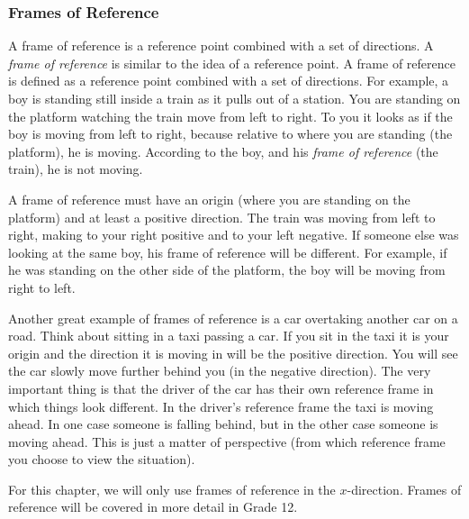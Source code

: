             \subsubsection*{Frames of Reference}
            \nopagebreak
\par
{} { A frame of reference is a reference point combined with a set of directions. } 
        \label{m38787*id62648}A \textsl{frame of reference} is similar to the idea of a reference point. A frame of reference is defined as a reference point combined with a set of directions. For example, a boy is standing still inside a train as it pulls out of a station. You are standing on the platform watching the train move from left to right. To you it looks as if the boy is moving from left to right, because relative to where you are standing (the platform), he is moving. According to the boy, and his \textsl{frame of reference} (the train), he is not moving.\par 
        \label{m38787*id62666}A frame of reference must have an origin (where you are standing on the platform) and at least a positive direction. The train was moving from left to right, making to your right positive and to your left negative. If someone else was looking at the same boy, his frame of reference will be different. For example, if he was standing on the other side of the platform, the boy will be moving from right to left.\par 
        \label{m38787*eip-271}Another great example of frames of reference is a car overtaking another car on a road. Think about sitting in a taxi passing a car. If you sit in the taxi it is your origin and the direction it is moving in will be the positive direction. You will see the car slowly move further behind you (in the negative direction). The very important thing is that the driver of the car has their own reference frame in which things look different. In the driver's reference frame the taxi is moving ahead. In one case someone is falling behind, but in the other case someone is moving ahead. This is just a matter of perspective (from which reference frame you choose to view the situation).\par \label{m38787*id62675}For this chapter, we will only use frames of reference in the $x$-direction.
Frames of reference will be covered in more detail in Grade 12.\par 
    \setcounter{subfigure}{0}
